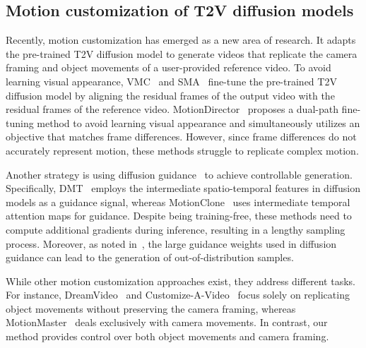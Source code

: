 \subsection{Motion customization of T2V diffusion models}
\label{sec:motion_customization}

Recently, motion customization has emerged as a new area of research. It adapts the pre-trained T2V diffusion model to generate videos that replicate the camera framing and object movements of a user-provided reference video. To avoid learning visual appearance, VMC~\cite{vmc} and SMA~\cite{sma} fine-tune the pre-trained T2V diffusion model by aligning the residual frames of the output video with the residual frames of the reference video. MotionDirector~\cite{md} proposes a dual-path fine-tuning method to avoid learning visual appearance and simultaneously utilizes an objective that matches frame differences. However, since frame differences do not accurately represent motion, these methods struggle to replicate complex motion.

Another strategy is using diffusion guidance~\cite{cfg, dsg, dragon} to achieve controllable generation. Specifically, DMT~\cite{dmt} employs the intermediate spatio-temporal features in diffusion models as a guidance signal, whereas MotionClone~\cite{mc} uses intermediate temporal attention maps for guidance. Despite being training-free, these methods need to compute additional gradients during inference, resulting in a lengthy sampling process. Moreover, as noted in~\cite{gw1, gw2}, the large guidance weights used in diffusion guidance can lead to the generation of out-of-distribution samples.

While other motion customization approaches exist, they address different tasks. For instance, DreamVideo~\cite{dreamvideo} and Customize-A-Video~\cite{cav} focus solely on replicating object movements without preserving the camera framing, whereas MotionMaster~\cite{mm} deals exclusively with camera movements. In contrast, our method provides control over both object movements and camera framing.
